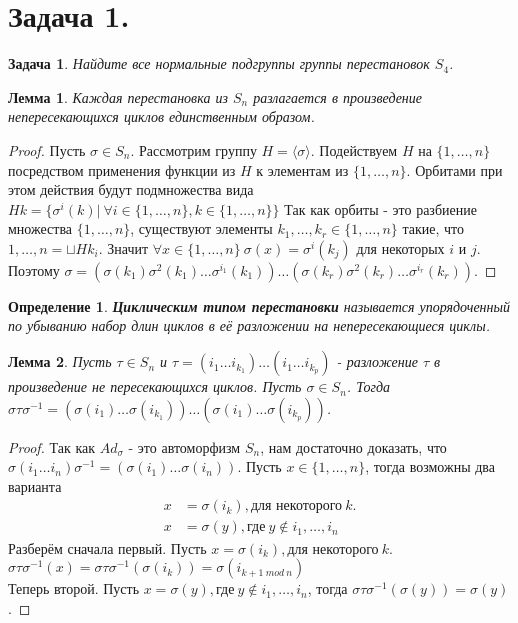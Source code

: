 \documentclass{article}
\newtheorem{task}{Задача}
\newtheorem{df}{Определение}
\newtheorem{lemma}{Лемма}
\newcommand{\icycle}[3]{(#1_{#2} \dots #1_{#3})}
\newcommand{\gen}[1]{\langle #1 \rangle}
\newcommand{\srange}[2]{\{#1, \dots, #2\}}
\newcommand{\irange}[3]{#1_{#2}, \dots, #1_{#3}}
\newcommand{\range}[2]{#1, \dots, #2}
\newcommand{\ad}[2]{#1#2#1^{-1}}
\newcommand{\adcycle}[4]{(#4(#1_{#2}) \dots #4(#1_{#3}))}
\begin{document}
\section*{Задача 1.}
\begin{task}
Найдите все нормальные подгруппы группы перестановок $S_4$.
\end{task}
\begin{lemma}
 Каждая перестановка из $S_n$ разлагается в произведение непересекающихся циклов единственным образом.   
\end{lemma}
\begin{proof}
    Пусть $\sigma \in S_n$. 
    Рассмотрим группу $H = \gen{\sigma} $.
    Подействуем $H$ на $\srange{1}{n}$  посредством применения функции из $H$ к элементам из $\srange{1}{n}$.
    Орбитами при этом действия будут подмножества вида 
    $Hk = \{ \sigma^i(k) | ~ \forall i \in \srange{1}{n},  k \in \srange{1}{n} \}$ 
    Так как орбиты - это разбиение множества ${\srange{1}{n}}$,
    существуют элементы ${\irange{k}{1}{r}} \in \srange{1}{n}$ такие, что 
    $\range{1}{n} = \sqcup Hk_i$.
    Значит $\forall x \in \srange{1}{n} ~ \sigma(x) = \sigma^i(k_j) $ для некоторых $i$ и $j$.
    Поэтому $\sigma = (\sigma(k_1)\sigma^2(k_1) \dots \sigma^{i_1}(k_1))\dots(\sigma(k_r)\sigma^2(k_r) \dots \sigma^{i_r}(k_r))$.
\end{proof}

\begin{df}
\textbf{Циклическим типом перестановки} называется упорядоченный по убыванию набор длин циклов в её разложении на непересекающиеся циклы.    
\end{df}

\begin{lemma}
    \label{sec1:action_by_conjugation}
    Пусть $\tau \in S_n$ и $\tau = \icycle{i}{1}{k_1} \dots \icycle{i}{1}{k_p}$ - 
    разложение $\tau$ в произведение не пересекающихся циклов.
    Пусть $\sigma \in S_n$.
    Тогда $\ad{\sigma}{\tau} = \adcycle{i}{1}{k_1}{\sigma} \dots \adcycle{i}{1}{k_p}{\sigma}$.
\end{lemma}
\begin{proof}
    Так как $Ad_{\sigma}$ - это автоморфизм $S_n$, 
    нам достаточно доказать, что $\ad{\sigma}{\icycle{i}{1}{n}} = \adcycle{i}{1}{n}{\sigma}$.
    Пусть $x \in \srange{1}{n}$,
    тогда возможны два варианта
    \begin{align*}
        x &= \sigma(i_k), \text{для некоторого} ~ k. \\ 
        x &= \sigma(y), \text{где} ~ y \notin \irange{i}{1}{n} 
    \end{align*} 
    Разберём сначала первый. Пусть $x = \sigma(i_k), \text{для некоторого} ~ k.$ 
    $\ad{\sigma}{\tau}(x) = \ad{\sigma}{\tau}(\sigma(i_k)) = \sigma(i_{k+1 ~ mod ~ n})$ \\
    Теперь второй. Пусть $x = \sigma(y), \text{где} ~ y \notin \irange{i}{1}{n}$, тогда 
    $\ad{\sigma}{\tau}(\sigma(y)) = \sigma(y)$.
\end{proof}
\end{document}
